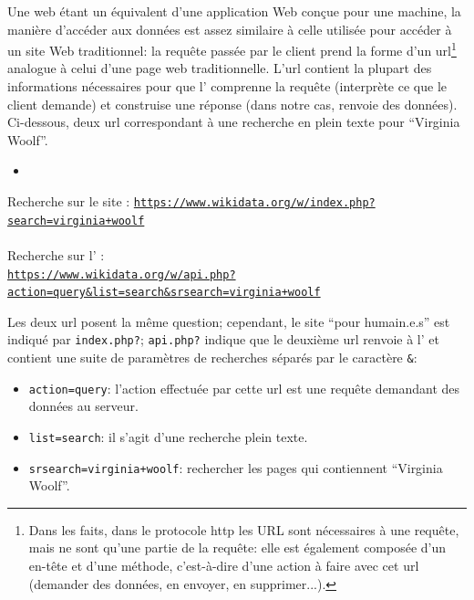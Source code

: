 Une \api{} web étant un équivalent d'une application Web conçue pour une machine, la manière d'accéder aux données est assez similaire à celle utilisée pour accéder à un site Web traditionnel: la requête passée par le client prend la forme d'un \gls{url}\footnote{Dans les faits, dans le protocole \gls{http} les URL sont nécessaires à une requête, mais ne sont qu'une partie de la requête: elle est également composée d'un en-tête et d'une méthode, c'est-à-dire d'une action à faire avec cet \gls{url} (demander des données, en envoyer, en supprimer...).} analogue à celui d'une page web traditionnelle. L'\gls{url} contient la plupart des informations nécessaires pour que l'\api{} comprenne la requête (interprète ce que le client demande) et construise une réponse (dans notre cas, renvoie des données). Ci-dessous, deux \gls{url} correspondant à une recherche en plein texte pour \enquote{Virginia Woolf}.
\begin{itemize}
	\item 
\end{itemize}

\begin{center}
	Recherche sur le site \wkd{}: \texttt{\url{https://www.wikidata.org/w/index.php?search=virginia+woolf}}
	\\~\\
	Recherche sur l'\api{} \wkd{}:\\ \texttt{\url{https://www.wikidata.org/w/api.php?action=query&list=search&srsearch=virginia+woolf}}
\end{center}

Les deux \gls{url} posent la même question; cependant, le site \enquote{pour humain.e.s} est indiqué par \texttt{index.php?}; \texttt{api.php?} indique que le deuxième \gls{url} renvoie à l'\api{} et contient une suite de paramètres de recherches séparés par le caractère \texttt{\&}:
\begin{itemize}
	\item \texttt{action=query}: l'action effectuée par cette \gls{url} est une requête demandant des données au serveur.
	\item \texttt{list=search}: il s'agit d'une recherche plein texte.
	\item \texttt{srsearch=virginia+woolf}: rechercher les pages qui contiennent \enquote{Virginia Woolf}.
\end{itemize}

